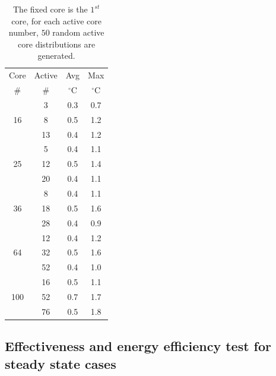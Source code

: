 \begin{table}
  \caption{The fixed core is the $1^{st}$ core, for each active core number, $50$ random active core distributions are generated.}
  \label{tab:opt_tem}
  \centering
  \begin{tabular}{c|c|c|c}
    \hline
    Core & Active     &  Avg  &   Max  \\
    \#       &   \#       &  $^{\circ}$C    & $^{\circ}$C  \\
     \hline
\hline
   \multirow{3}{*}{16} &      3        &   0.3 &   0.7    \\   
             &      8       &    0.5     &  1.2     \\
             &      13     &     0.4    &   1.2   \\
     \hline
  \multirow{3}{*}{25} &      5       &    0.4 & 1.1      \\ 
              &     12      &    0.5     &    1.4     \\
              &     20      &    0.4     &    1.1     \\ 
     \hline
  \multirow{3}{*}{36}  &     8        &    0.4  &    1.1  \\
              &     18      &   0.5      &   1.6     \\
              &     28      &    0.4     &   0.9  \\
     \hline
  \multirow{3}{*}{64}  &     12      &   0.4  &   1.2  \\
              &     32      &    0.5     &     1.6       \\
              &     52      &     0.4   &     1.0    \\
 \hline 
\multirow{3}{*}{100}  & 16 & 	 0.5&	1.1\\
                      & 52 &	 0.7&	1.7\\
                      & 76 &	 0.5&	1.8\\
\hline
\end{tabular}
\end{table}


\subsection{Effectiveness and energy efficiency test for steady state cases}


